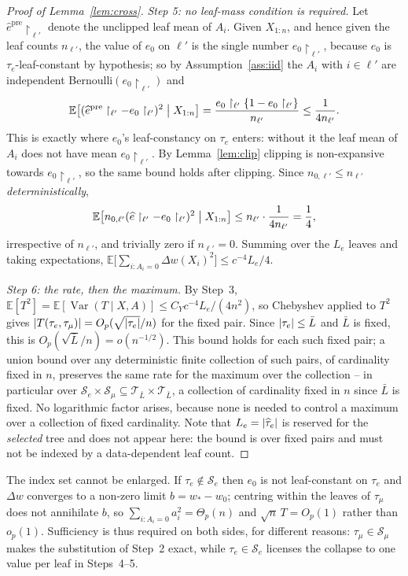 \documentclass[11pt]{article}
\theoremstyle{plain}
\theoremstyle{definition}
\theoremstyle{remark}
\newcommand{\E}{\mathbb{E}}
\newcommand{\cT}{\mathcal{T}}
\newcommand{\cS}{\mathcal{S}}
\newcommand{\ez}{e_0}
\newcommand{\wz}{w_0}
\newcommand{\ehat}{\widehat{e}}
\newcommand{\that}{\widehat{\tau}}
\DeclareMathOperator{\Var}{Var}
\DeclarePairedDelimiter{\abs}{\lvert}{\rvert}
\DeclarePairedDelimiter{\card}{\lvert}{\rvert}
\begin{document}
\begin{proof}[Proof of Lemma~\ref{lem:cross}]
\emph{Step 5: no leaf-mass condition is required.} Let
$\ehat^{\mathrm{pre}}\restriction_{\ell'}$ denote the unclipped leaf mean of
$A_i$. Given $X_{1:n}$, and hence given the leaf counts $n_{\ell'}$, the value
of $\ez$ on $\ell'$ is the single number $\ez\restriction_{\ell'}$, because
$\ez$ is $\tau_e$-leaf-constant by hypothesis; so by Assumption~\ref{ass:iid}
the $A_i$ with $i\in\ell'$ are independent Bernoulli$(\ez\restriction_{\ell'})$
and
\[
  \E\bigl[(\ehat^{\mathrm{pre}}\restriction_{\ell'}
   -\ez\restriction_{\ell'})^2\bigm| X_{1:n}\bigr]
  =\frac{\ez\restriction_{\ell'}\{1-\ez\restriction_{\ell'}\}}{n_{\ell'}}
  \le\frac1{4n_{\ell'}} .
\]
This is exactly where $\ez$'s leaf-constancy on $\tau_e$ enters: without it
the leaf mean of $A_i$ does not have mean $\ez\restriction_{\ell'}$. By
Lemma~\ref{lem:clip} clipping is non-expansive towards $\ez\restriction_{\ell'}$,
so the same bound holds after clipping. Since $n_{0,\ell'}\le n_{\ell'}$
\emph{deterministically},
\[
  \E\bigl[n_{0,\ell'}
   (\ehat\restriction_{\ell'}-\ez\restriction_{\ell'})^2\bigm| X_{1:n}\bigr]
  \le n_{\ell'}\cdot\frac1{4n_{\ell'}}=\frac14 ,
\]
irrespective of $n_{\ell'}$, and trivially zero if $n_{\ell'}=0$. Summing over
the $L_e$ leaves and taking expectations,
$\E\bigl[\sum_{i:A_i=0}\Delta w(X_i)^2\bigr]\le c^{-4}L_e/4$.

\emph{Step 6: the rate, then the maximum.} By Step~3,
$\E[T^2]=\E[\Var(T\mid X,A)]\le C_Yc^{-4}L_e/(4n^2)$, so Chebyshev applied to
$T^2$ gives $\abs{T(\tau_e,\tau_\mu)}=O_p(\sqrt{\card{\tau_e}}/n)$ for the
fixed pair. Since $\card{\tau_e}\le\bar L$ and $\bar L$ is fixed, this is
$O_p(\sqrt{\bar L}/n)=o(n^{-1/2})$. This bound holds for each such fixed pair;
a union bound over any deterministic finite collection of such pairs, of
cardinality fixed in $n$, preserves the same rate for the maximum over the
collection -- in particular over $\cS_e\times\cS_\mu\subseteq\cT_{\bar
L}\times\cT_{\bar L}$, a collection of cardinality fixed in $n$ since $\bar L$
is fixed. No logarithmic factor arises, because none is needed to control a
maximum over a collection of fixed cardinality. Note that $L_e=\card{\that_e}$
is reserved for the \emph{selected} tree and does not appear here: the bound
is over fixed pairs and must not be indexed by a data-dependent leaf count.
\end{proof}

\noindent The index set cannot be enlarged. If $\tau_e\notin\cS_e$ then $\ez$ is
not leaf-constant on $\tau_e$ and $\Delta w$ converges to a non-zero limit
$b=w_*-\wz$; centring within the leaves of $\tau_\mu$ does not annihilate $b$, so
$\sum_{i:A_i=0}a_i^2=\Theta_p(n)$ and $\sqrt n\,T=O_p(1)$ rather than $o_p(1)$.
Sufficiency is thus required on both sides, for different reasons:
$\tau_\mu\in\cS_\mu$ makes the substitution of Step~2 exact, while
$\tau_e\in\cS_e$ licenses the collapse to one value per leaf in Steps~4--5.
\end{document}
